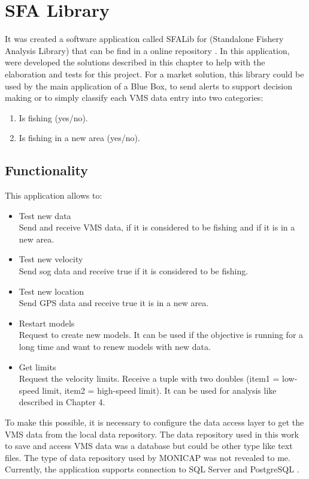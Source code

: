 \section{SFA Library} %
\label{sub:sfa_library}

It was created a software application called SFALib for (Standalone Fishery Analysis Library) that can be find in a online repository \cite{sfagithub}. In this application, were developed the solutions described in this chapter to help with the elaboration and tests for this project. For a market solution, this library could be used by the main application of a Blue Box, to send alerts to support decision making or to simply classify each VMS data entry into two categories:
\begin{enumerate}
\item Is fishing (yes/no).
\item Is fishing in a new area (yes/no).
\end{enumerate}



\subsection{Functionality} %
\label{sub:functionality}

This application allows to:
\begin{itemize}
\item Test new data \\ Send and receive VMS data, if it is considered to be fishing and if it is in a new area.
\item Test new velocity \\ Send sog data and receive true if it is considered to be fishing.
\item Test new location \\ Send GPS data and receive true it is in a new area.
\item Restart models \\ Request to create new models. It can be used if the objective is running for a long time and want to renew models with new data. 
\item Get limits \\ Request the velocity limits. Receive a tuple with two doubles (item1 = low-speed limit, item2 = high-speed limit). It can be used for analysis like described in Chapter 4.
\end{itemize}

To make this possible, it is necessary to configure the data access layer to get the VMS data from the local data repository. The data repository used in this work to save and access VMS data was a database but could be other type like text files. The type of data repository used by MONICAP was not revealed to me.
Currently, the application supports connection to SQL Server \cite{WEBSITE:SqlServer} and PostgreSQL \cite{WEBSITE:Postgresql}.


